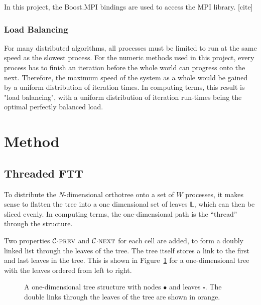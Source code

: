 \documentclass[twoside]{IIBproject}
\newcommand{\acc}{{\mkern 0.5mu\cdot\mkern 0.5mu}}
\numberwithin{figure}{section}
\begin{document}
            In this project, the Boost.MPI bindings are used to access the MPI library. [cite]



        \subsubsection{Load Balancing} %
            \label{sec:loadbalancing}

            For many distributed algorithms, all processes must be limited to run at the same speed as the slowest process. For the numeric methods used in this project, every process has to finish an iteration before the whole world can progress onto the next. Therefore, the maximum speed of the system as a whole would be gained by a uniform distribution of iteration times. In computing terms, this result is "load balancing", with a uniform distribution of iteration run-times being the optimal perfectly balanced load. 





\section{Method} %
    \label{sec:method}

    \subsection{Threaded FTT} %
        \label{sec:tftt}

        To distribute the $N$-dimensional orthotree onto a set of $W$ processes, it makes sense to flatten the tree into a one dimensional set of leaves $\mathbb{L}$, which can then be sliced evenly. In computing terms, the one-dimensional path is the ``thread'' through the structure. 

        Two properties $\mathcal{C}\acc\textproc{prev}$ and $\mathcal{C}\acc\textproc{next}$ for each cell are added, to form a doubly linked list through the leaves of the tree. The tree itself stores a link to the first and last leaves in the tree. This is shown in Figure~\ref{fig:tftt-flattree} for a one-dimensional tree with the leaves ordered from left to right. 

        \begin{figure}[H]
            \centering
            
            \caption{A one-dimensional tree structure with nodes $\bullet$ and leaves $\square$. The double links through the leaves of the tree are shown in orange.}
            \label{fig:tftt-flattree}
        \end{figure}
\end{document}
